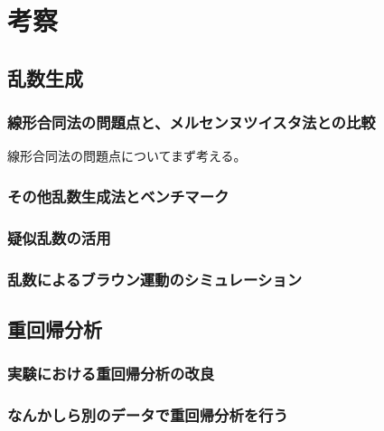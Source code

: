 \documentclass[../../../main]{subfiles}
\begin{document}
\section{考察}\label{sec:consideration}

\subsection{乱数生成}

\subsubsection{線形合同法の問題点と、メルセンヌツイスタ法との比較}
線形合同法の問題点についてまず考える。

\subsubsection{その他乱数生成法とベンチマーク}

\subsubsection{疑似乱数の活用}

\subsubsection{乱数によるブラウン運動のシミュレーション}


\subsection{重回帰分析}

\subsubsection{実験における重回帰分析の改良}

\subsubsection{なんかしら別のデータで重回帰分析を行う}
\end{document}
